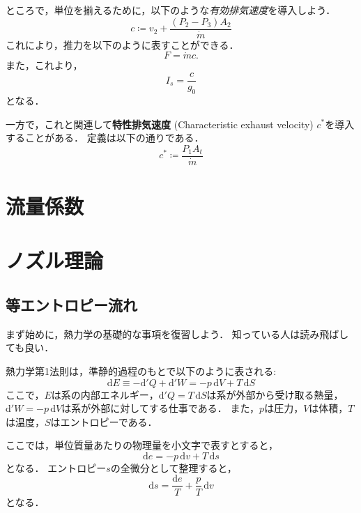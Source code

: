 \documentclass[uplatex,dvipdfmx,a4j,11pt]{jsreport}
\newcommand{\keyword}[1]{\textcolor{mainblue}{\textbf{#1}}}
\newcommand{\diff}{\mathrm{d}} %
\numberwithin{equation}{chapter}
\begin{document}
ところで，単位を揃えるために，以下のような\emph{有効排気速度}を導入しよう．
\begin{equation}
  c \coloneqq v_2 + \frac{(P_2 - P_3) A_2}{\dot{m}}
\end{equation}
これにより，推力を以下のように表すことができる．
\begin{equation}
  F = \dot{m} c.
\end{equation}
また，これより，
\begin{equation}
  I_s = \frac{c}{g_0}
\end{equation}
となる．

一方で，これと関連して\keyword{特性排気速度} (Characteristic exhaust velocity) $c^*$を導入することがある．
定義は以下の通りである．
\begin{equation}
  c^* \coloneqq \frac{P_1 A_t}{\dot{m}}
\end{equation}



\section{流量係数}
\section{ノズル理論}
\subsection{等エントロピー流れ}
まず始めに，熱力学の基礎的な事項を復習しよう．
知っている人は読み飛ばしても良い．

熱力学第1法則は，準静的過程のもとで以下のように表される:
\begin{equation}
  \diff E \equiv -\diff'Q + \diff'W = -p \, \diff V + T \, \diff S
\end{equation}
ここで，$E$は系の内部エネルギー，$\diff'Q = T \, \diff S$は系が外部から受け取る熱量，$\diff'W = -p \, \diff V$は系が外部に対してする仕事である．
また，$p$は圧力，$V$は体積，$T$は温度，$S$はエントロピーである．

ここでは，単位質量あたりの物理量を小文字で表すとすると，
\begin{equation}
  \diff e = -p \, \diff v + T \, \diff s
\end{equation}
となる．
エントロピー$s$の全微分として整理すると，
\begin{equation}
  \diff s = \frac{\diff e}{T} + \frac{p}{T} \, \diff v
\end{equation}
となる．
\end{document}
